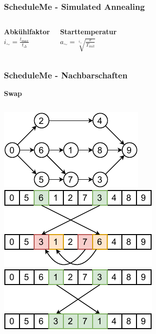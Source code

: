 \documentclass[aspectratio=169]{beamer}
\begin{document}

\begin{frame}
\frametitle{ScheduleMe - Simulated Annealing}
\centering
\begin{columns}[c] %
	
	\Large
	\textbf{Abkühlfaktor}\\
	\LARGE
	$i_{\sim} = \frac{t_{max}}{t_{\Delta}}$
	
	\Large
	\textbf{Starttemperatur}\\
	\LARGE
	$a_{\sim} = \sqrt[i_{\sim}]{\frac{x}{T_{init}}}$

	
\end{columns}
\end{frame}


\begin{frame}
\frametitle{ScheduleMe - Nachbarschaften}
\textbf{Swap}
\begin{columns}[c] %
	\includegraphics[scale=1.3]{../images/tree.pdf}	
	\includegraphics[scale=1.2]{../images/swap0.pdf}
	\includegraphics[scale=1.2]{../images/swap1.pdf}	
\end{columns}
\end{frame}
\end{document}
